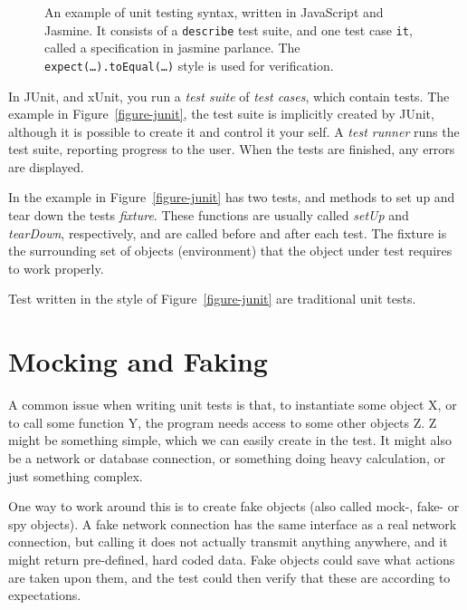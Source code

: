 \documentclass[a4paper,11pt]{kth-mag}
\begin{document}
\begin{figure}[h!]
	\begin{center}
	\begin{minipage}{0.9\textwidth}
		\lstset{language=JavaScript}
		
	\end{minipage}
	\end{center}
  \caption{An example of unit testing syntax, written in JavaScript and
    Jasmine. It consists of a \texttt{describe} test suite, and one test case
    \texttt{it}, called a specification in jasmine parlance. The
    \texttt{expect(\dots).toEqual(\dots)} style is used for verification.}
	\label{figure-jasmine}
\end{figure}

In JUnit, and xUnit, you run a \textit{test suite} of \textit{test cases},
which contain tests. The example in Figure~\ref{figure-junit}, the test suite
is implicitly created by JUnit, although it is possible to create it and
control it your self. A \textit{test runner} runs the test suite, reporting
progress to the user. When the tests are finished, any errors are displayed.

In the example in Figure~\ref{figure-junit} has two tests, and methods to set
up and tear down the tests \textit{fixture}. These functions are usually called
\textit{setUp} and \textit{tearDown}, respectively, and are called before and
after each test. The fixture is the surrounding set of objects (environment)
that the object under test requires to work properly.

Test written in the style of Figure~\ref{figure-junit} are traditional unit
tests.


\section{Mocking and Faking} \label{section-mocking}

A common issue when writing unit tests is that, to instantiate some object X,
or to call some function Y, the program needs access to some other objects Z. Z
might be something simple, which we can easily create in the test. It might
also be a network or database connection, or something doing heavy calculation,
or just something complex.

One way to work around this is to create fake objects (also called mock-, fake-
or spy objects). A fake network connection has the same interface as a real
network connection, but calling it does not actually transmit anything
anywhere, and it might return pre-defined, hard coded data. Fake objects could
save what actions are taken upon them, and the test could then verify that
these are according to expectations.
\end{document}
